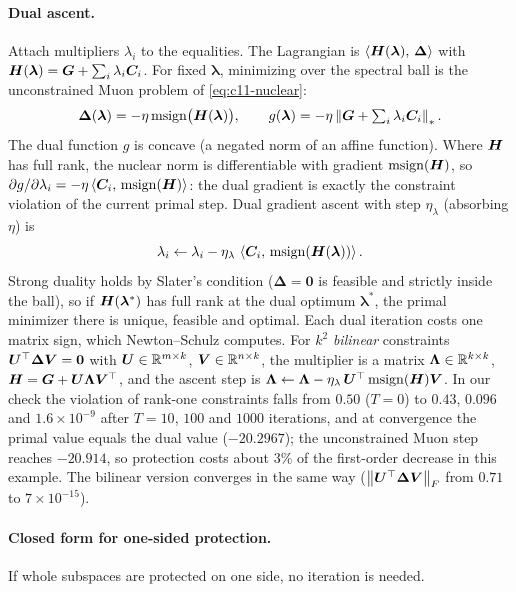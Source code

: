 \paragraph{Dual ascent.} Attach multipliers $\lambda_i$ to the equalities. The Lagrangian is
$\left\langle \bm{H}(\bm{\lambda}),\, \bm{\Delta}\right\rangle$ with $\bm{H}(\bm{\lambda}) = \bm{G} + \sum_i\lambda_i\bm{C}_i$. For fixed
$\bm{\lambda}$, minimizing over the spectral ball is the unconstrained Muon problem of
\cref{eq:c11-nuclear}:
\begin{equation}
  \bm{\Delta}(\bm{\lambda}) = -\eta\operatorname{msign}\bigl(\bm{H}(\bm{\lambda})\bigr),
  \qquad
  g(\bm{\lambda}) = -\eta\left\lVert \bm{G} + \textstyle\sum_i\lambda_i\bm{C}_i\right\rVert_* .
  \label{eq:c11-mo-dual}
\end{equation}
The dual function $g$ is concave (a negated norm of an affine function). Where $\bm{H}$ has full
rank, the nuclear norm is differentiable with gradient
$\operatorname{msign}(\bm{H})$, so $\partial g/\partial\lambda_i = -\eta\left\langle \bm{C}_i,\, \operatorname{msign}(\bm{H})\right\rangle$:
the dual gradient is exactly the constraint violation of the current primal step. Dual gradient
ascent with step $\eta_\lambda$ (absorbing $\eta$) is
\begin{equation}
  \lambda_i \leftarrow \lambda_i - \eta_\lambda\,\left\langle \bm{C}_i,\, \operatorname{msign}(\bm{H}(\bm{\lambda}))\right\rangle .
  \label{eq:c11-mo-ascent}
\end{equation}
Strong duality holds by Slater's condition ($\bm{\Delta} = \bm{0}$ is feasible and strictly inside the
ball), so if $\bm{H}(\bm{\lambda}^*)$ has full rank at the dual optimum $\bm{\lambda}^*$, the primal
minimizer there is unique, feasible and optimal. Each dual iteration costs
one matrix sign, which Newton--Schulz computes. For $k^2$ \emph{bilinear} constraints
$\bm{U}^{\top}\bm{\Delta}\bm{V} = \bm{0}$ with $\bm{U} \in \mathbb{R}^{m\times k}$, $\bm{V} \in \mathbb{R}^{n\times k}$, the multiplier
is a matrix $\bm{\Lambda} \in \mathbb{R}^{k\times k}$, $\bm{H} = \bm{G} + \bm{U}\bm{\Lambda}\bm{V}^{\top}$, and the ascent step is
$\bm{\Lambda} \leftarrow \bm{\Lambda} - \eta_\lambda\,\bm{U}^{\top}\operatorname{msign}(\bm{H})\bm{V}$. In our check the
violation of rank-one constraints falls from $0.50$ ($T = 0$) to $0.43$, $0.096$ and
$1.6\times10^{-9}$ after $T = 10$, $100$ and $1000$ iterations, and at convergence the primal value
equals the dual value ($-20.2967$); the unconstrained Muon step reaches $-20.914$, so protection
costs about $3\%$ of the first-order decrease in this example. The bilinear version converges in
the same way ($\left\lVert \bm{U}^{\top}\bm{\Delta}\bm{V}\right\rVert_F$ from $0.71$ to $7\times10^{-15}$).

\paragraph{Closed form for one-sided protection.} If whole subspaces are protected on one side,
no iteration is needed.

